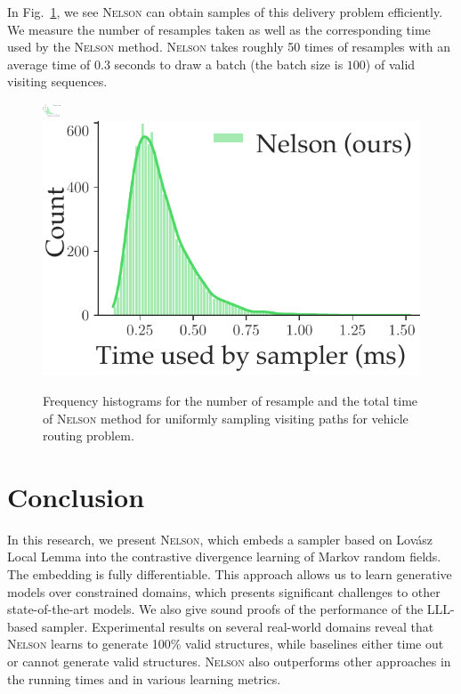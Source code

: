 \documentclass[letterpaper]{article} %
\newcommand{\lovasz}{{Lov\'asz}\xspace}
\newcommand{\nls}{\textsc{Nelson}\xspace}
\begin{document}
In Fig.~\ref{fig:route}, we see  \nls can obtain samples of this delivery problem efficiently. We measure the number of resamples taken as well as the corresponding time used  by the \nls method. \nls takes roughly 50 times of resamples with an average time of $0.3$ seconds to draw a batch (the batch size is $100$) of valid visiting sequences.

\begin{figure}[!t]
\centering
\includegraphics[width=0.074844\linewidth,height=0.15in ]{exp/sat/vehicle.resamples.pdf}
\includegraphics[width=0.495\linewidth]{exp/sat/vehicle.time.pdf}
\caption{Frequency histograms for the number of resample and the total time of \nls method for uniformly sampling visiting paths for vehicle routing problem.}
\label{fig:route}
\end{figure}

\vspace{-1.46mm}
\vspace{-3.15mm}
\section{Conclusion}
In this research, we present \nls, which  embeds a sampler based on \lovasz Local Lemma into the contrastive divergence learning of Markov random fields. The embedding is fully differentiable. This approach allows us to learn generative models over constrained domains, which presents significant challenges to other state-of-the-art models.
We also give sound proofs of the performance of the LLL-based sampler.
Experimental results on several real-world domains reveal that \nls learns to generate 100\% valid structures, while baselines either time out or cannot generate valid structures.
\nls also outperforms other approaches in the running times and in various learning metrics.



\vspace{-0.93mm}
\vspace{-1.61mm}
\end{document}

